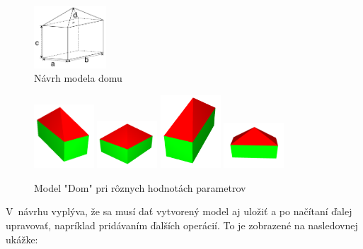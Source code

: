 \begin{figure}[H]
	\centering
	\includegraphics[width=0.24\textwidth]{obrazky-figures/Examples/B4.pdf}
	\caption{Návrh modela domu}
	\label{fig:homeModelnavrh}
\end{figure}

\begin{figure}[H]
	\centering
	\includegraphics[width=0.20\textwidth]{obrazky-figures/Examples/home.png}
	\includegraphics[width=0.20\textwidth]{obrazky-figures/Examples/home1.png}
	\includegraphics[width=0.20\textwidth]{obrazky-figures/Examples/home2.png}
	\includegraphics[width=0.20\textwidth]{obrazky-figures/Examples/home3.png}
	\caption{Model "Dom" pri rôznych hodnotách parametrov}
	\label{fig:homeModel}
\end{figure}

V~návrhu vyplýva, že sa musí dať vytvorený model aj uložiť a po načítaní ďalej upravovať, napríklad pridávaním ďalších operácií. To je zobrazené na nasledovnej ukážke:\nopagebreak 

